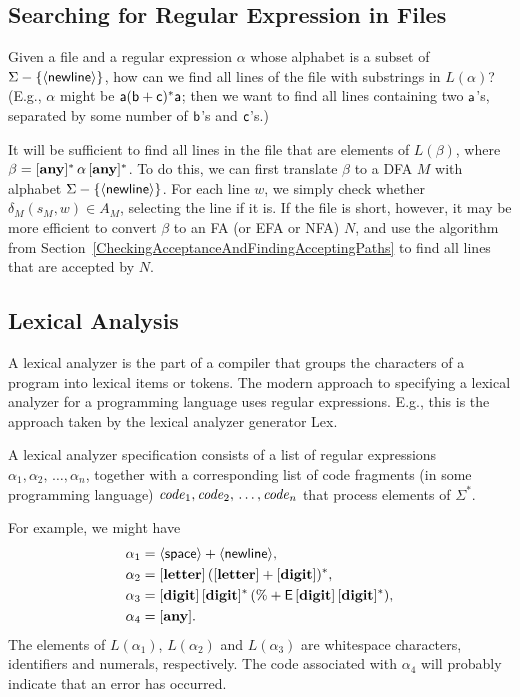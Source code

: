 \subsection{Searching for Regular Expression in Files}

%
Given a file and a regular expression $\alpha$ whose alphabet is a
subset of $\Sigma-\{\mathsf{\langle newline\rangle}\}$, how can we find all lines of the
file with substrings in $L(\alpha)$?  (E.g., $\alpha$ might be
$\mathsf{\mathsf{a}(\mathsf{b}+\mathsf{c})^*\mathsf{a}}$; then we want to find all lines
containing two $\mathsf{a}$'s, separated by some number of $\mathsf{b}$'s and
$\mathsf{c}$'s.)

It will be sufficient to find all lines in the file that are elements
of $L(\beta)$, where $\beta = [\mathbf{any}]^*\,\alpha\,[\mathbf{any}]^*$.  To do this, we
can first translate $\beta$ to a DFA $M$ with alphabet
$\Sigma-\{\mathsf{\langle newline\rangle}\}$.  For each line $w$, we simply check whether
$\delta_M(s_M,w)\in A_M$, selecting the line if it is.  If the file is
short, however, it may be more efficient to convert $\beta$ to an FA
(or EFA or NFA) $N$, and use the algorithm from
Section~\ref{CheckingAcceptanceAndFindingAcceptingPaths} to find all
lines that are accepted by $N$.

\subsection{Lexical Analysis}

%
A lexical analyzer is the part of a compiler that groups the
characters of a program into lexical items or tokens.  The modern
approach to specifying a lexical analyzer for a programming language
uses regular expressions.  E.g., this is the approach taken by the
lexical analyzer generator Lex.

A lexical analyzer specification consists of a list of regular
expressions $\alpha_1,\alpha_2,\,\ldots,\alpha_n$, together with a
corresponding list of code fragments (in some programming language)
${\it code}_1,{\it code}_2,\,\ldots,{\it code}_n$ that process elements of
$\Sigma^*$.

For example, we might have
\begin{align*}
\alpha_1 &= \mathsf{\langle space\rangle} + \mathsf{\langle newline\rangle} , \\
\alpha_2 &= [\mathbf{letter}]\,([\mathbf{letter}] + [\mathbf{digit}])^* ,\\
\alpha_3 &= [\mathbf{digit}]\,[\mathbf{digit}]^*\,(\% + \mathsf{E}\,[\mathbf{digit}]\,[\mathbf{digit}]^*) , \\
\alpha_4 &= [\mathbf{any}] .
\end{align*}
The elements of $L(\alpha_1)$, $L(\alpha_2)$ and $L(\alpha_3)$ are
whitespace characters, identifiers and numerals, respectively.  The
code associated with $\alpha_4$ will probably indicate that an error
has occurred.


